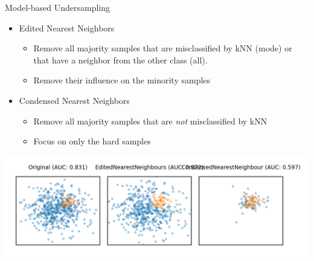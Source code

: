 \begin{frame}[allowframebreaks]{Model-based Undersampling}
\begin{itemize}
    \item Edited Nearest Neighbors
    \begin{itemize}
        \item Remove all majority samples that are misclassified by kNN (mode) or that have a neighbor from the other class (all).
        \item Remove their influence on the minority samples
    \end{itemize}
    \item Condensed Nearest Neighbors
    \begin{itemize}
        \item Remove all majority samples that are \textit{not} misclassified by kNN
        \item Focus on only the hard samples
    \end{itemize}
\end{itemize}

\begin{center}
    \includegraphics[width=0.75\linewidth]{images/pre-processing/model-based-undersampling.png}
\end{center}
\end{frame}


